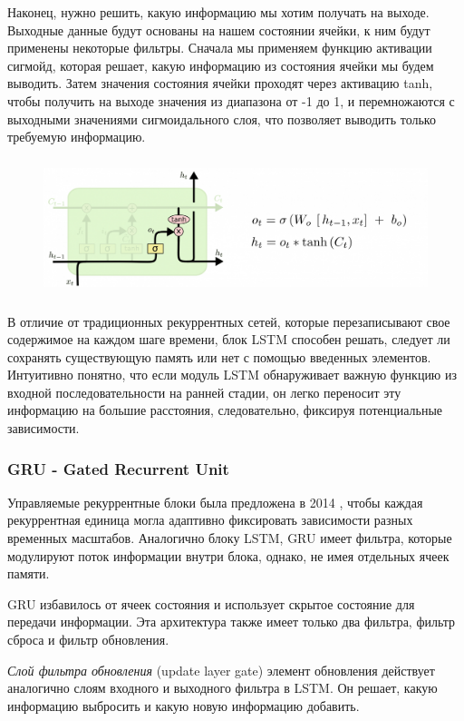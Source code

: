 	Наконец, нужно решить, какую информацию мы хотим получать на выходе. Выходные данные будут основаны на нашем состоянии ячейки, к ним будут применены некоторые фильтры. Сначала мы применяем функцию активации сигмойд, которая решает, какую информацию из состояния ячейки мы будем выводить. Затем значения состояния ячейки проходят через активацию tanh, чтобы получить на выходе значения из диапазона от -1 до 1, и перемножаются с выходными значениями сигмоидального слоя, что позволяет выводить только требуемую информацию.

    \begin{figure}[ht!]
		\centering
		\captionsetup{justification=centering}
		\includegraphics[height=40mm]{img/LSTM_step4.png}
	\end{figure}
	
	В отличие от традиционных рекуррентных сетей, которые перезаписывают свое содержимое на каждом шаге времени, блок LSTM способен решать, следует ли сохранять существующую память или нет с помощью введенных элементов. Интуитивно понятно, что если модуль LSTM обнаруживает важную функцию из входной последовательности на ранней стадии, он легко переносит эту информацию на большие расстояния, следовательно, фиксируя потенциальные зависимости.
	
	\subsubsection{GRU - Gated Recurrent Unit}
	
	Управляемые рекуррентные блоки была предложена в 2014 \cite{3}, чтобы каждая рекуррентная единица могла адаптивно фиксировать зависимости разных временных масштабов. Аналогично блоку LSTM, GRU имеет
	фильтра, которые модулируют поток информации внутри блока, однако, не имея отдельных ячеек памяти.
	
    GRU избавилось от ячеек состояния и использует скрытое состояние для передачи информации. Эта архитектура также имеет только два фильтра, фильтр сброса и фильтр обновления.
    
    \textit{Слой фильтра обновления} (update layer gate) элемент обновления действует аналогично слоям входного и выходного фильтра в LSTM. Он решает, какую информацию выбросить и какую новую информацию добавить.
    
